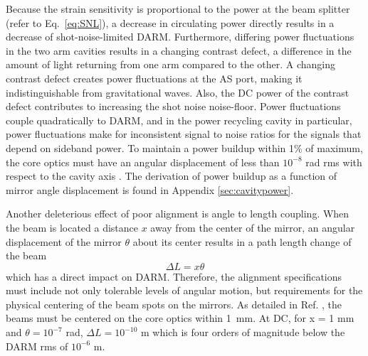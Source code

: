 Because the strain sensitivity is proportional to the power at the beam splitter (refer to Eq.~\ref{eq:SNL}), a decrease in circulating power directly results in a decrease of shot-noise-limited DARM. Furthermore, differing power fluctuations in the two arm cavities results in a changing contrast defect, a difference in the amount of light returning from one arm compared to the other. A changing contrast defect creates power fluctuations at the AS port, making it indistinguishable from gravitational waves. Also, the DC power of the contrast defect contributes to increasing the shot noise noise-floor. Power fluctuations couple quadratically to DARM, and in the power recycling cavity in particular, power fluctuations make for inconsistent signal to noise ratios for the signals that depend on sideband power. To maintain a power buildup within 1\% of maximum, the core optics must have an angular displacement of less than $10^{-8}$ rad rms with respect to the cavity axis \cite{ISCGroup1998ASC}. The derivation of power buildup as a function of mirror angle displacement is found in Appendix \ref{sec:cavitypower}.

Another deleterious effect of poor alignment is angle to length coupling. 
When the beam is located a distance $x$ away from the center of the mirror, an
angular displacement of the mirror $\theta$ about its center results in a path
length change of the beam
\begin{equation}
\Delta{L} = x \theta
\end{equation}
which has a direct impact on DARM. Therefore, the alignment specifications must include not only tolerable levels of angular motion, but requirements for the physical centering of the beam spots on the mirrors. As detailed in Ref. \cite{ISCGroup1998ASC}, the beams must be centered on the core optics within 1~mm. At DC, for x = 1 mm and $\theta = 10^{-7}$ rad, $\Delta{L} = 10^{-10}$ m which is four orders of magnitude below the DARM rms of $10^{-6}$ m. 




